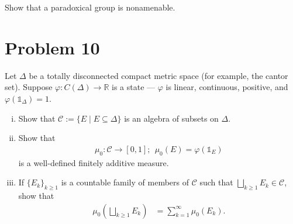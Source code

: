 \documentclass[10pt]{extarticle}
\newcommand{\R}{\mathbb{R}}
\begin{document}
  Show that a paradoxical group is nonamenable.
  \section{Problem 10}%
  Let $\Delta$ be a totally disconnected compact metric space (for example, the cantor set). Suppose $\varphi: C(\Delta)\rightarrow \R$ is a state --- $\varphi$ is linear, continuous, positive, and $\varphi\left(\mathbb{1}_{\Delta}\right) = 1$.
  \begin{enumerate}[(i)]
    \item Show that $\mathcal{C} := \{E\mid E\subseteq \Delta\}$ is an algebra of subsets on $\Delta$.
    \item Show that
      \begin{align*}
        \mu_0: \mathcal{C}\rightarrow [0,1];~~\mu_0(E) = \varphi\left(\mathbb{1}_{E}\right)
      \end{align*}
      is a well-defined finitely additive measure.
    \item If $\{E_k\}_{k\geq 1}$ is a countable family of members of $\mathcal{C}$ such that $\bigsqcup_{k\geq 1}E_k \in \mathcal{C}$, show that
      \begin{align*}
        \mu_0\left(\bigsqcup_{k\geq 1}E_k\right) &= \sum_{k=1}^{\infty}\mu_0(E_k).
      \end{align*}
  \end{enumerate}
\end{document}
